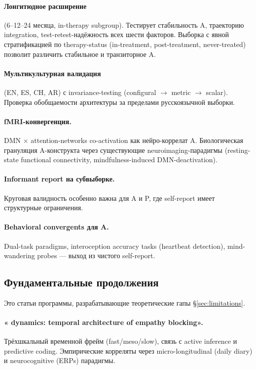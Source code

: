 \paragraph{Лонгитюдное расширение} (6--12--24 месяца, in-therapy subgroup). Тестирует стабильность A, траекторию integration, test-retest-надёжность всех шести факторов. Выборка с явной стратификацией по therapy-status (in-treatment, post-treatment, never-treated) позволит различить стабильное и транзиторное A.

\paragraph{Мультикультурная валидация} (EN, ES, CH, AR) с invariance-testing (configural $\to$ metric $\to$ scalar). Проверка обобщаемости архитектуры за пределами русскоязычной выборки.

\paragraph{fMRI-конвергенция.} DMN $\times$ attention-networks co-activation как нейро-коррелат A. Биологическая грануляция A-конструкта через существующие neuroimaging-парадигмы (resting-state functional connectivity, mindfulness-induced DMN-deactivation).

\paragraph{Informant report на субвыборке.} Круговая валидность особенно важна для A и P, где self-report имеет структурные ограничения.

\paragraph{Behavioral convergents для A.} Dual-task paradigms, interoception accuracy tasks (heartbeat detection), mind-wandering probes --- выход из чистого self-report.

\subsection{Фундаментальные продолжения}

Это статьи программы, разрабатывающие теоретические гапы §\ref{sec:limitations}.

\paragraph{«\DEIC{} dynamics: temporal architecture of empathy blocking».} Трёхшкальный временной фрейм (fast/meso/slow), связь с active inference и predictive coding. Эмпирические корреляты через micro-longitudinal (daily diary) и neurocognitive (ERPs) парадигмы.

